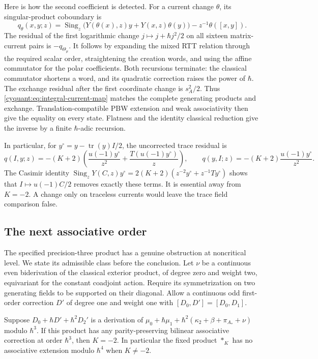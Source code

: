 Here is how the second coefficient is detected.  For a current change
$\theta$, its singular-product coboundary is
\[
 q_\theta(x,y;z)=\operatorname{Sing}_z
       \bigl(Y(\theta(x),z)y+Y(x,z)\theta(y)\bigr)
                         -z^{-1}\theta([x,y]).
\]
The residual of the first logarithmic change
$j\mapsto j+\hbar j^2/2$ on all sixteen matrix-current pairs is
$-q_{\Theta_\mu}$.  It follows by expanding the mixed RTT relation
through the required scalar order, straightening the creation words,
and using the affine commutator for the polar coefficients.
Both recursions terminate: the classical commutator shortens a word,
and its quadratic correction raises the power of $\hbar$.
The exchange residual after the first coordinate change is
$s_A^2/2$.  Thus \eqref{cyquant:eq:integral-current-map} matches the
complete generating products and exchange.  Translation-compatible
PBW extension and weak associativity then give the equality on every
state.  Flatness and the identity classical reduction give the inverse
by a finite $\hbar$-adic recursion.

In particular, for $y^\circ=y-\operatorname{tr}(y)I/2$, the uncorrected
trace residual is
\[
 q(I,y;z)=-(K+2)
       \left(\frac{u(-1)y^\circ}{z^2}
                      +\frac{T(u(-1)y^\circ)}z\right),
 \qquad q(y,I;z)=-(K+2)\frac{u(-1)y^\circ}{z^2}.
\]
The Casimir identity
$\operatorname{Sing}_zY(C,z)y^\circ
 =2(K+2)(z^{-2}y^\circ+z^{-1}Ty^\circ)$
shows that $I\mapsto u(-1)C/2$ removes exactly these terms.
It is essential away from $K=-2$.  A change only on traceless
currents would leave the trace field comparison false.

\subsection{The next associative order}

The specified precision-three product has a genuine obstruction at
noncritical level.  We state its admissible class before the conclusion.
Let $\nu$ be a continuous even biderivation of the classical exterior
product, of degree zero and weight two, equivariant for the constant
coadjoint action.  Require its symmetrization on two generating fields
to be supported on their diagonal.  Allow a continuous odd first-order
correction $D'$ of degree one and weight one with
$[D_0,D']=[D_0,D_1]$.

\begin{proposition}\label{cyquant:prop:third-obstruction}
Suppose $D_0+\hbar D'+\hbar^2D_2'$ is a derivation of
$\mu_0+\hbar\mu_1+\hbar^2(\kappa_2+\beta+\pi_{A_*}+\nu)$
modulo $\hbar^3$.  If this product has any parity-preserving bilinear
associative correction at order $\hbar^3$, then $K=-2$.
In particular the fixed product $*_K$ has no associative extension
modulo $\hbar^4$ when $K\ne-2$.
\end{proposition}

